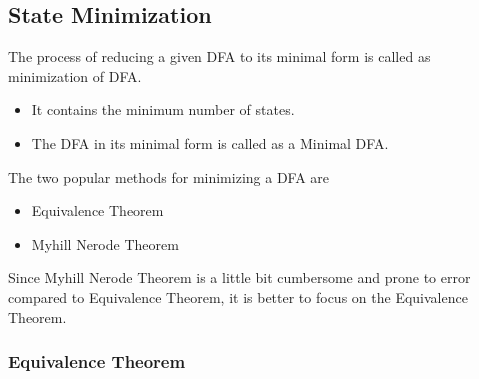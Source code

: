 \subsection{State Minimization}

The process of reducing a given DFA to its minimal form is called as minimization of DFA.
\begin{itemize}
  \item It contains the minimum number of states.
  \item The DFA in its minimal form is called as a Minimal DFA.
\end{itemize}

\noindent The two popular methods for minimizing a DFA are
\begin{itemize}
  \item Equivalence Theorem
  \item Myhill Nerode Theorem
\end{itemize}

\noindent Since Myhill Nerode Theorem is a little bit cumbersome and prone to error compared to Equivalence Theorem, it is better to focus on the Equivalence Theorem.

\newpage
\subsubsection{Equivalence Theorem}

